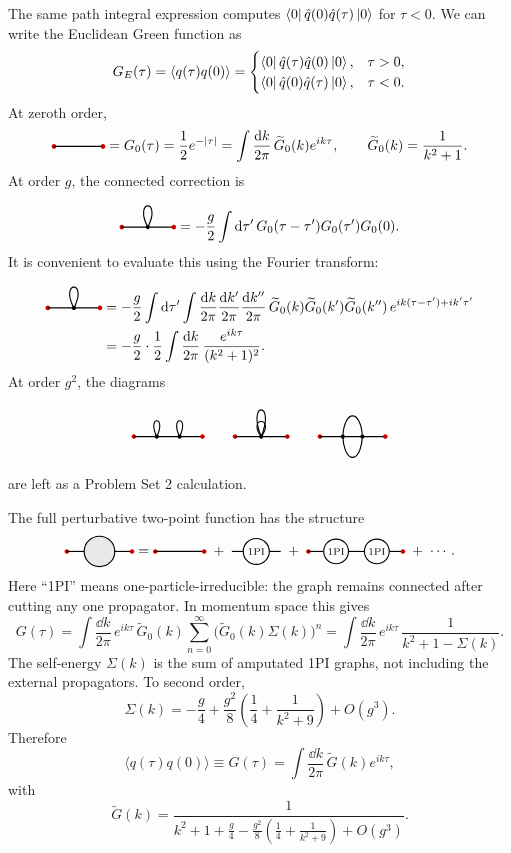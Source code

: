 The same path integral expression computes
\(\bra{0}\hat q(0)\hat q(\tau)\ket{0}\) for \(\tau<0\). We can write the
Euclidean Green function as
\[
  G_E(\tau)=\langle q(\tau)q(0)\rangle
  =
  \begin{cases}
    \bra{0}\hat q(\tau)\hat q(0)\ket{0}, & \tau>0,\\
    \bra{0}\hat q(0)\hat q(\tau)\ket{0}, & \tau<0.
  \end{cases}
\]
At zeroth order,
\[
  \qftFreeProp
  =
  G_0(\tau)
  =
  \frac{1}{2}e^{-|\tau|}
  =
  \int\frac{\dd k}{2\pi}\,\widetilde G_0(k)e^{ik\tau},
  \qquad
  \widetilde G_0(k)=\frac{1}{k^2+1}.
\]
At order \(g\), the connected correction is
\[
  \qftTadpoleProp
  =
  -\frac{g}{2}
  \int\dd\tau'\,
  G_0(\tau-\tau')G_0(\tau')G_0(0).
\]
It is convenient to evaluate this using the Fourier transform:
\[
\begin{aligned}
  \qftTadpoleProp
  &=
  -\frac{g}{2}
  \int\dd\tau'
  \int\frac{\dd k}{2\pi}\frac{\dd k'}{2\pi}\frac{\dd k''}{2\pi}\,
  \widetilde G_0(k)\widetilde G_0(k')\widetilde G_0(k'')\,
  e^{ik(\tau-\tau')+ik'\tau'}                                      \\
  &=
  -\frac{g}{2}\cdot\frac{1}{2}
  \int\frac{\dd k}{2\pi}\,
  \frac{e^{ik\tau}}{(k^2+1)^2}.
\end{aligned}
\]
At order \(g^2\), the diagrams
\[
  \qftTwoVertexTadpoles
  \qquad
  \qftDoubleTadpoleProp
  \qquad
  \qftBubbleProp
\]
are left as a Problem Set 2 calculation.

The full perturbative two-point function has the structure
\[
  \qftBlobProp
  =
  \qftFreeProp
  \;+\;
  \qftOnePI
  \;+\;
  \qftOnePIChain
  \;+\;\cdots .
\]
Here ``1PI'' means one-particle-irreducible: the graph remains connected
after cutting any one propagator. In momentum space this gives
\[
  G(\tau)
  =
  \int\frac{\dd k}{2\pi}\,e^{ik\tau}\,
  \widetilde G_0(k)
  \sum_{n=0}^{\infty}\bigl(\widetilde G_0(k)\Sigma(k)\bigr)^n
  =
  \int\frac{\dd k}{2\pi}\,e^{ik\tau}\,
  \frac{1}{k^2+1-\Sigma(k)}.
\]
The self-energy \(\Sigma(k)\) is the sum of amputated 1PI graphs, not
including the external propagators. To second order,
\[
  \Sigma(k)
  =
  -\frac{g}{4}
  +
  \frac{g^2}{8}
  \left(
    \frac{1}{4}+\frac{1}{k^2+9}
  \right)
  +O(g^3).
\]
Therefore
\[
  \langle q(\tau)q(0)\rangle
  \equiv G(\tau)
  =
  \int\frac{\dd k}{2\pi}\,\widetilde G(k)e^{ik\tau},
\]
with
\[
  \widetilde G(k)
  =
  \frac{1}{
    k^2+1+\frac{g}{4}
    -\frac{g^2}{8}\left(\frac{1}{4}+\frac{1}{k^2+9}\right)
    +O(g^3)
  }.
\]

